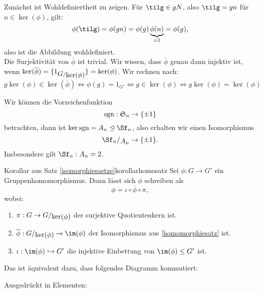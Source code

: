 \begin{beweis}
Zunächst ist Wohldefiniertheit zu zeigen. Für $\tilg \in gN$, also $\tilg = gn$ für $n \in \ker (\phi)$, gilt:
\begin{equation}
\phi( \tilg) = \phi(gn) = \phi(g)\underbrace{\phi(n)}_{=1} = \phi(g),
\end{equation}
also ist die Abbildung wohldefiniert.\\
Die Surjektivität von $\overline{\phi}$ ist trivial. Wir wissen, dass $\overline{\phi}$ genau dann injektiv ist, wenn $\ker (\overline{\phi}) = \{1_{\quotient{G}{\ker (\phi) }}\} = \ker (\phi)$. Wir rechnen nach:
\begin{equation}
g \ker (\phi) \in \ker (\overline{\phi}) \iff \phi(g) = 1_{G'} \iff g \in \ker (\phi) \iff g \ker (\phi) = \ker (\phi)
\end{equation}
\end{beweis}
\begin{beispiel}
Wir können die Vorzeichenfunktion 
\begin{equation}
\text{sgn}: \mathfrak{S}_n \to \{\pm 1\}
\end{equation}
betrachten, dann ist $\ker{\sgn} = A_n \trianglelefteq \Sf_n$, also erhalten wir einen Isomorphismus 
\begin{equation}
\quotient{\Sf_n}{A_n} \to \{ \pm 1\}.
\end{equation}
Insbesondere gilt $\Sf_n : A_n = 2$.
\end{beispiel}
\begin{korollar}{Korollar aus Satz \ref{isomorphiesaetze}}{korollarhomosatz}
Sei $\phi: G \to G'$ ein Gruppenhomomorphismus. Dann lässt sich $\phi$ schreiben als
\begin{equation}
\phi = \iota \circ \overline{\phi} \circ \pi,
\end{equation}
wobei:
\begin{enumerate}
\item $\pi:G \to \quotient{G}{\ker (\phi)}$ der surjektive Quotientenkern ist.
\item $\overline{\phi}: \quotient{G}{\ker (\phi)} \to \im (\phi)$ der Isomorphismus aus \ref{homomorphiesatz} ist.
\item $\iota: \im (\phi) \hookrightarrow G'$ die injektive Einbettung von $\im (\phi) \leq G'$ ist.
\end{enumerate}
Das ist äquivalent dazu, dass folgendes Diagramm kommutiert:
\begin{center}
\end{center}
Ausgedrückt in Elementen:
\begin{center}
\end{center}
\end{korollar}
